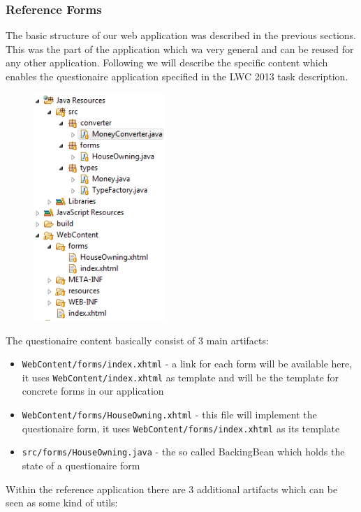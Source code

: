 \subsubsection{Reference Forms}
\label{subsec:referenceForms}
The basic structure of our web application was described in the previous
sections. This was the part of the application which wa very general and can be
reused for any other application. Following we will describe the specific
content which enables the questionaire application specified in the LWC 2013
task description. 

\begin{figure}
 \includegraphics[width=5cm]{./images/chapter02/referenceimpl_forms.png}
\end{figure}

The questionaire content basically consist of 3 main artifacts:

\begin{itemize}
\item \texttt{WebContent/forms/index.xhtml} - a link for each form will be
available here, it uses \texttt{WebContent/index.xhtml} as template and will be
the template for concrete forms in our application
\item \texttt{WebContent/forms/HouseOwning.xhtml} - this file will implement the
questionaire form, it uses \texttt{WebContent/forms/index.xhtml} as its template
\item \texttt{src/forms/HouseOwning.java} - the so called BackingBean which
holds the state of a questionaire form
\end{itemize}

Within the reference application there are 3 additional artifacts which can be
seen as some kind of utils:

